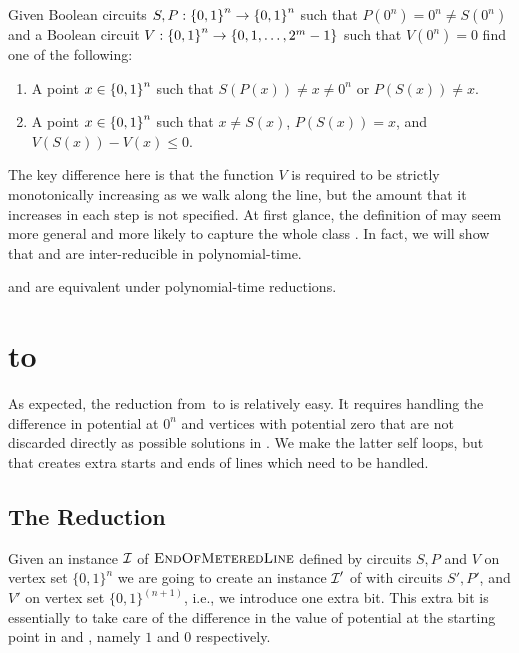 \begin{definition}[\EOPL]
\label{def:EOPL}
Given Boolean circuits $S,P : \left\{ 0,1 \right\}^n \to \left\{ 0,1 \right\}^n$ such that $P(0^n) =0^n\neq S(0^n)$ and a Boolean circuit $V: \left\{ 0,1 \right\}^n \to \left\{ 0,1,\dotsc,2^m - 1 \right\}$ such that $V(0^n) = 0$ find one of the following:
\begin{enumerate}[label=(R\arabic*)]
\item A point $x \in \left\{ 0,1 \right\}^n$ such that $S(P(x)) \neq x \neq 0^n$ or $P(S(x)) \neq x$. \label{eopl:eol}
\item A point $x \in \left\{ 0,1 \right\}^n$ such that $x \neq S(x)$, $P(S(x)) = x$, and $V(S(x)) - V(x) \leq 0$. \label{eopl:bad_potential}
\end{enumerate}
\end{definition}

The key difference here is that the function $V$ is required to be strictly
monotonically increasing as we walk along the line, but the amount that it
increases in each step is not specified.
At first glance, the definition of \EOPL may seem more general and more likely to 
capture the whole class \CLS. In fact, we will show that \EOML and \EOPL are 
inter-reducible in polynomial-time.
%
\begin{theorem}
\EOML and \EOPL are equivalent under polynomial-time reductions.
\end{theorem}

\section{\EOML to \EOPL}

As expected, the reduction from~\EOML to \EOPL is relatively easy. It requires
handling the difference in potential at $0^n$ and vertices with potential zero that
are not discarded directly as possible solutions in \EOPL. We make the latter
self loops, but that creates extra starts and ends of lines which need to be
handled.

\subsection{The Reduction}

Given an instance $\mbox{${\mathcal I}$}$ of $\textsc{EndOfMeteredLine}$ defined by circuits $S,P$ and $V$ on vertex
set $\{0,1\}^n$ we are going to create an instance $\mbox{${\mathcal I}$}'$ of \EOPL with circuits
$S',P'$, and $V'$ on vertex set $\{0,1\}^{(n+1)}$, i.e., we introduce one extra bit.  
This extra bit is essentially to take care of the difference in the value of potential 
at the starting point in \EOML and \EOPL, namely $1$ and $0$ respectively. 

